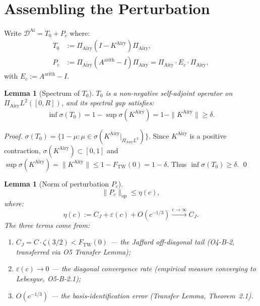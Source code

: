 \documentclass[12pt,a4paper]{amsart}
\newtheorem{lemma}[theorem]{Lemma}
\theoremstyle{definition}
\newcommand{\KAi}{K^{\mathrm{Airy}}}
\newcommand{\DAi}{\mathcal{D}^{\mathrm{Ai}}}
\newcommand{\PAi}{\Pi_{\mathrm{Airy}}}
\newcommand{\Aarith}{A^{\mathrm{arith}}}
\newcommand{\norm}[1]{\|#1\|}
\begin{document}
\section{Assembling the Perturbation}
\label{sec:assembling}

Write $\DAi = T_0 + P_c$ where:
\begin{align}
  T_0 &:= \PAi(I - \KAi)\PAi, \label{eq:T0}\\
  P_c &:= \PAi(\Aarith - I)\PAi = \PAi\cdot E_c\cdot\PAi, \label{eq:Pc}
\end{align}
with $E_c := \Aarith - I$.

\begin{lemma}[Spectrum of $T_0$]\label{lem:T0}
$T_0$ is a non-negative self-adjoint operator on $\PAi L^2([0,R])$,
and its spectral gap satisfies:
\begin{equation}\label{eq:T0gap}
  \inf\sigma(T_0) = 1 - \sup\sigma(\KAi) = 1 - \norm{\KAi} \ge \delta.
\end{equation}
\end{lemma}

\begin{proof}
$\sigma(T_0) = \{1 - \mu : \mu \in \sigma(\KAi|_{\PAi L^2})\}$.
Since $\KAi$ is a positive contraction, $\sigma(\KAi) \subset [0,1]$
and $\sup\sigma(\KAi) = \norm{\KAi} \le 1 - F_{\mathrm{TW}}(0) = 1 - \delta$.
Thus $\inf\sigma(T_0) \ge \delta$. \qed
\end{proof}

\begin{lemma}[Norm of perturbation $P_c$]\label{lem:Pc}
\begin{equation}\label{eq:Pcnorm}
  \norm{P_c}_{\mathrm{op}} \le \eta(c),
\end{equation}
where:
\begin{equation}\label{eq:eta}
  \eta(c) := C_J + \varepsilon(c) + O(c^{-1/3}) \xrightarrow{c\to\infty} C_J.
\end{equation}
The three terms come from:
\begin{enumerate}[label=(\alph*)]
  \item $C_J = C\cdot\zeta(3/2) < F_{\mathrm{TW}}(0)$
        — the Jaffard off-diagonal tail (O4-B-2, transferred via O5 Transfer Lemma);
  \item $\varepsilon(c) \to 0$ — the diagonal convergence rate
        (empirical measure converging to Lebesgue, O5-B-2.1);
  \item $O(c^{-1/3})$ — the basis-identification error
        (Transfer Lemma, Theorem~2.1).
\end{enumerate}
\end{lemma}
\end{document}
